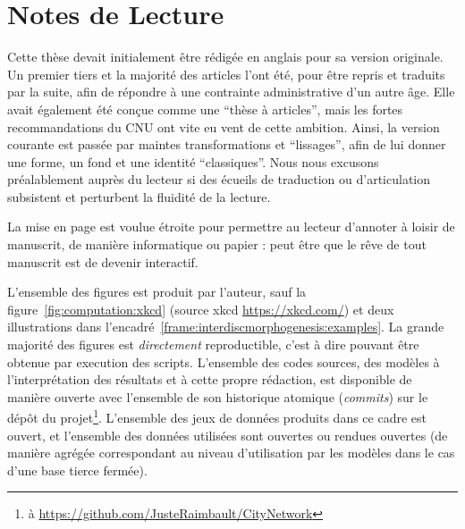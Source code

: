 



\begingroup
\let\clearpage\relax
\let\cleardoublepage\relax
\let\cleardoublepage\relax


\chapter*{Notes de Lecture}



Cette thèse devait initialement être rédigée en anglais pour sa version originale. Un premier tiers et la majorité des articles l'ont été, pour être repris et traduits par la suite, afin de répondre à une contrainte administrative d'un autre âge. Elle avait également été conçue comme une ``thèse à articles'', mais les fortes recommandations du CNU ont vite eu vent de cette ambition. Ainsi, la version courante est passée par maintes transformations et ``lissages'', afin de lui donner une forme, un fond et une identité ``classiques''. Nous nous excusons préalablement auprès du lecteur si des écueils de traduction ou d'articulation subsistent et perturbent la fluidité de la lecture.

La mise en page est voulue étroite pour permettre au lecteur d'annoter à loisir de manuscrit, de manière informatique ou papier : peut être que le rêve de tout manuscrit est de devenir interactif.

L'ensemble des figures est produit par l'auteur, sauf la figure~\ref{fig:computation:xkcd} (source xkcd \url{https://xkcd.com/}) et deux illustrations dans l'encadré~\ref{frame:interdiscmorphogenesis:examples}. La grande majorité des figures est \emph{directement} reproductible, c'est à dire pouvant être obtenue par execution des scripts. L'ensemble des codes sources, des modèles à l'interprétation des résultats et à cette propre rédaction, est disponible de manière ouverte avec l'ensemble de son historique atomique (\emph{commits}) sur le dépôt du projet\footnote{à \url{https://github.com/JusteRaimbault/CityNetwork}}. L'ensemble des jeux de données produits dans ce cadre est ouvert, et l'ensemble des données utilisées sont ouvertes ou rendues ouvertes (de manière agrégée correspondant au niveau d'utilisation par les modèles dans le cas d'une base tierce fermée).

